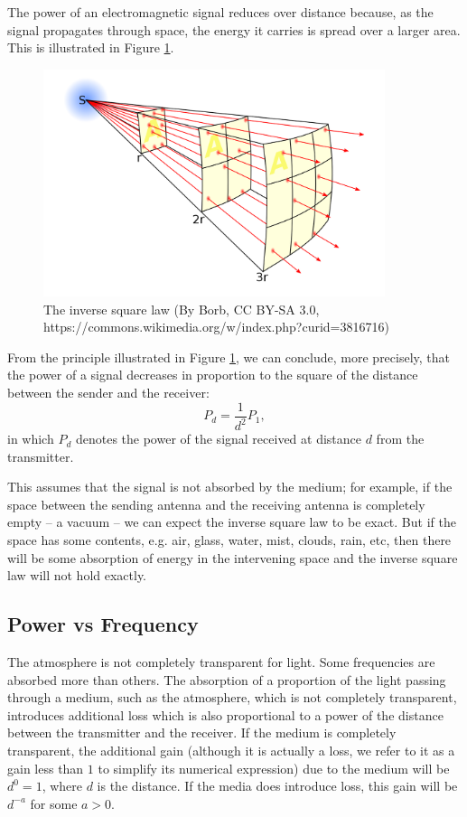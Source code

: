 The power of an electromagnetic signal reduces over distance because,
as the signal propagates through space, the energy it carries is spread
over a larger area. This is illustrated in Figure \ref{inversesquarelaw}.
\begin{figure}
	\centering
	\includegraphics[width=10cm]{Inverse_square_law_svg}
	\caption{The inverse square law (By Borb, CC BY-SA 3.0, https://commons.wikimedia.org/w/index.php?curid=3816716)}
	\label{inversesquarelaw}
\end{figure}

From the principle illustrated in Figure \ref{inversesquarelaw}, we can conclude,
more precisely, that the power of a signal decreases in proportion to the square of the distance
between the sender and the receiver:
\begin{equation}
	P_d = \frac{1}{d^2} P_1,
\end{equation}
in which $P_d$ denotes the power of the signal received at distance $d$ from the transmitter.

This assumes that the signal is not absorbed by the medium; for example, if the space between
the sending antenna and the receiving antenna is completely empty -- a vacuum -- we can expect
the inverse square law to be exact. But if the space has some contents, e.g. air, glass, water, 
mist, clouds, rain, etc, then there will be some absorption of energy in the intervening space
and the inverse square law will not hold exactly.

\subsection{Power vs Frequency }

The atmosphere is not completely transparent for light. Some frequencies are absorbed
more than others. The absorption of a proportion of the light passing through
a medium, such as the atmosphere, which is not completely transparent, introduces
additional loss which is also proportional to a power of the distance between the
transmitter and the receiver. If the medium is completely transparent, the additional
gain (although it is actually a loss, we refer to it as a gain less than $1$
to simplify its numerical expression) due to the medium will be $d^0=1$, where
$d$ is the distance. If the media does introduce loss, this gain will be $d^{-a}$
for some $a>0$.


